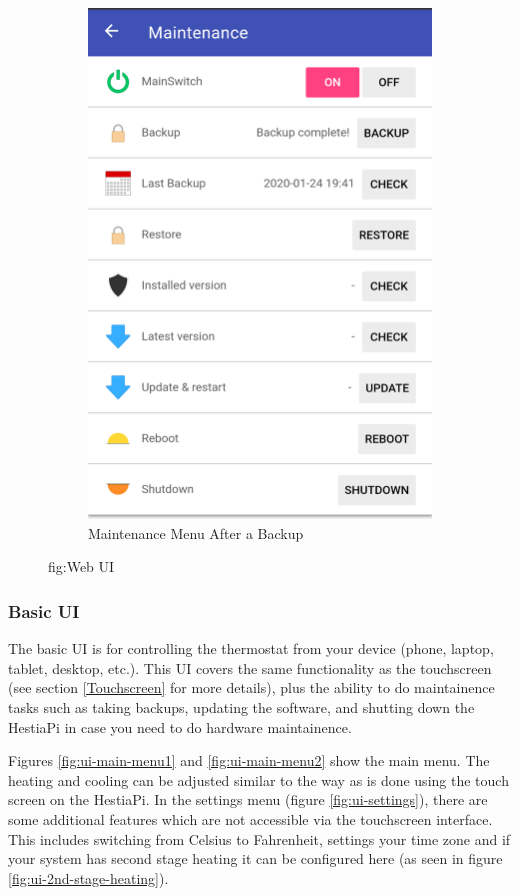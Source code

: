 \begin{figure}
\begin{subfigure}{0.33\textwidth}
  \includegraphics[width=.75\linewidth]{img/ui-maintenance2.png}
  \caption{Maintenance Menu After a Backup}
  \label{fig:ui-maintenance2}
\end{subfigure}
\caption{fig:Web UI}
\label{fig:Web UI}
\end{figure}


\subsubsection{Basic UI} \label{Basic UI}
The basic UI is for controlling the thermostat from your device (phone, laptop,
tablet, desktop, etc.).  This UI covers the same functionality as the
touchscreen (see section \ref{Touchscreen} for more details), plus the ability
to do maintainence tasks such as taking backups, updating the software, and
shutting down the HestiaPi in case you need to do hardware maintainence.

Figures \ref{fig:ui-main-menu1} and \ref{fig:ui-main-menu2} show the main menu.
The heating and cooling can be adjusted similar to the way as is done using the
touch screen on the HestiaPi.  In the settings menu (figure
\ref{fig:ui-settings}), there are some additional features which are not
accessible via the touchscreen interface.  This includes switching from Celsius
to Fahrenheit, settings your time zone and if your system has second stage
heating it can be configured here (as seen in figure
\ref{fig:ui-2nd-stage-heating}).


